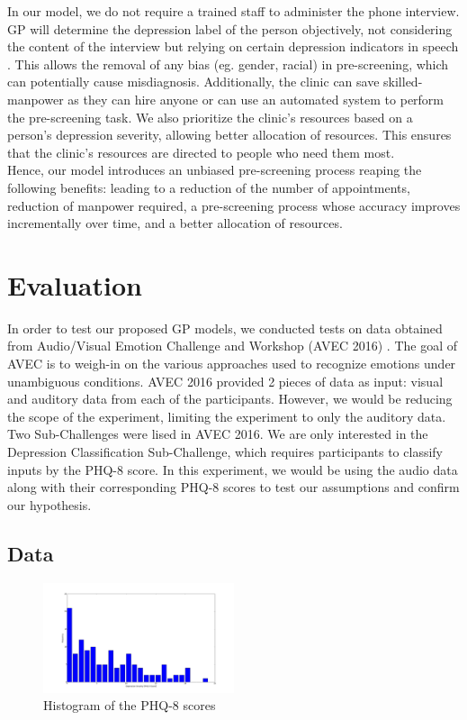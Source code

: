 \documentclass{article}
\begin{document}
	In our model, we do not require a trained staff to administer the phone interview. 
	GP will determine the depression label of the person objectively, not considering the content of the interview but relying on certain depression indicators in speech \cite{nimh2015}. 
	This allows the removal of any bias (eg. gender, racial) in pre-screening, which can potentially cause misdiagnosis. 
	Additionally, the clinic can save skilled-manpower as they can hire anyone or can use an automated system to perform the pre-screening task.
	We also prioritize the clinic's resources based on a person's depression severity, allowing better allocation of resources. 
	This ensures that the clinic's resources are directed to people who need them most. \\

	Hence, our model introduces an unbiased pre-screening process reaping the following benefits: leading to a reduction of the number of appointments, reduction of manpower required, a pre-screening process whose accuracy improves incrementally over time, and a better allocation of resources.

	\section{Evaluation}
	In order to test our proposed GP models, we conducted tests on data obtained from Audio/Visual Emotion Challenge and Workshop (AVEC 2016) \cite{avec2016}. 
	The goal of AVEC is to weigh-in on the various approaches used to recognize emotions under unambiguous conditions. 
	AVEC 2016 provided 2 pieces of data as input: visual and auditory data from each of the participants. 
	However, we would be reducing the scope of the experiment, limiting the experiment to only the auditory data. 
	Two Sub-Challenges were lised in AVEC 2016. 
	We are only interested in the Depression Classification Sub-Challenge, which requires participants to classify inputs by the PHQ-8 score. 
	In this experiment, we would be using the audio data along with their corresponding PHQ-8 scores to test our assumptions and confirm our hypothesis.

	\subsection{Data}
	\begin{figure}[h]
	\center
 	\includegraphics[width=0.5\textwidth]{histogram_phq8}
	\caption{Histogram of the PHQ-8 scores}
	\label{histogram_phq8}
	\end{figure}
	
\end{document}
